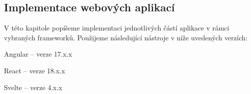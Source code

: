 \subsection{Implementace webových aplikací}

V této kapitole popíšeme implementaci jednotlivých částí aplikace v rámci vybraných frameworků. Použijeme následující nástroje v níže uvedených verzích:

\begin{citemize}
	\item Angular -- verze 17.x.x
	\item React -- verze 18.x.x
	\item Svelte -- verze 4.x.x
\end{citemize}



